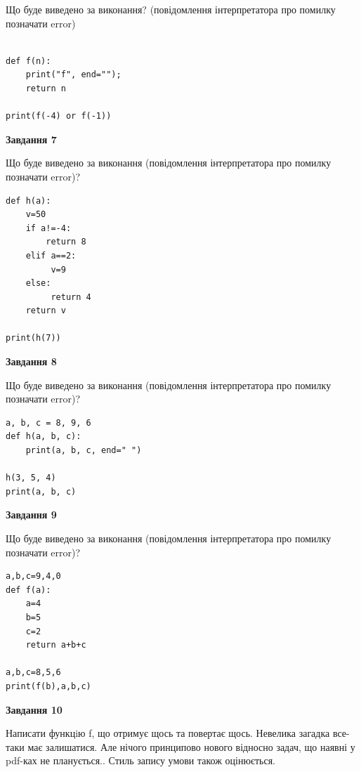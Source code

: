 \documentclass[12pt, ukrainian]{article}
\begin{document}
{\begin {large}
Що буде виведено за виконання? (повідомлення інтерпретатора про помилку позначати error)\par
\begin{verbatim}

def f(n):
    print("f", end="");
    return n

print(f(-4) or f(-1))
\end{verbatim}

{\begin {center}\textbf{Завдання 7}\end {center}}

Що буде виведено за виконання (повідомлення інтерпретатора про помилку позначати error)?\par
\begin{verbatim}
def h(a):
    v=50
    if a!=-4: 
        return 8
    elif a==2:
         v=9
    else:
         return 4
    return v

print(h(7))
\end{verbatim}

{\begin {center}\textbf{Завдання 8}\end {center}}

Що буде виведено за виконання (повідомлення інтерпретатора про помилку позначати error)?\par
\begin{verbatim}
a, b, c = 8, 9, 6
def h(a, b, c):
    print(a, b, c, end=" ")

h(3, 5, 4)
print(a, b, c)
\end{verbatim}

{\begin {center}\textbf{Завдання 9}\end {center}}

Що буде виведено за виконання (повідомлення інтерпретатора про помилку позначати error)?\par
\begin{verbatim}
a,b,c=9,4,0
def f(a):
    a=4
    b=5
    c=2
    return a+b+c

a,b,c=8,5,6
print(f(b),a,b,c)
\end{verbatim}

{\begin {center}\textbf{Завдання 10}\end {center}}


Написати функцiю f, що отримує щось та повертає щось. Невелика загадка все-таки має залишатися. Але нічого принципово нового відносно задач, що наявні у pdf-ках не планується.. Стиль запису умови також оцінюється.\par
\end {large}}
\newpage
\end{document}
